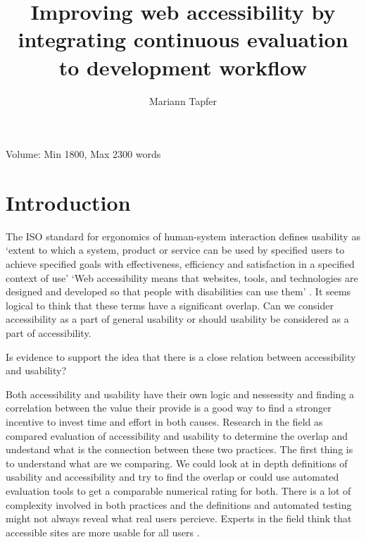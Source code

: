 \documentclass{thesis_proposal}
\title{Improving web accessibility by integrating continuous evaluation to development workflow}
\author{Mariann Tapfer}
\begin{document}
\maketitle
Volume:  Min 1800, Max 2300 words

\section{Introduction}
The ISO standard for ergonomics of human-system interaction defines usability as `extent to which a system, product or service can be used by specified users to achieve specified goals with effectiveness, efficiency and satisfaction in a specified context of use' \citep{ISO_2019}
`Web accessibility means that websites, tools, and technologies are designed and developed so that people with disabilities can use them' \citep{WAI_introduction_2022}.
It seems logical to think that these terms have a significant overlap. Can we consider accessibility as a part of general usability or should usability be considered as a part of accessibility.
\begin{RQlist}
	\item Is evidence to support the idea that there is a close relation between accessibility and usability?
\end{RQlist}


Both accessibility and usability have their own logic and nessessity and finding a correlation between the value their provide is a good way to find a stronger incentive to invest time and effort in both causes. Research in the field as compared evaluation of accessibility and usability \citep{onay_durdu_perception_2020, aizpurua_exploring_2016, petrie_relationship_2007} to determine the overlap and undestand what is the connection between these two practices. The first thing is to understand what are we comparing. We could look at in depth definitions of usability and accessibility and try to find the overlap or could use automated evaluation tools to get a comparable numerical rating for both. There is a lot of complexity involved in both practices and the definitions and automated testing might not always reveal what real users percieve.
Experts in the field think that accessible sites are more usable for all users \citep{onay_durdu_perception_2020}.
\end{document}
